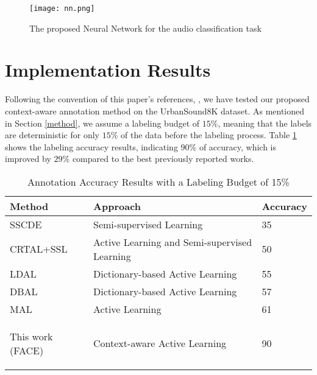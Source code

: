 \documentclass{article}
\begin{document}
\begin{figure}
	\centering	
	\texttt{[image: nn.png]}  		
	\caption{The proposed Neural Network for the audio classification task}
	\label{fig: nn}
\end{figure}

\section{Implementation Results}
\label{results}
Following the convention of this paper's references, \citep{Shuyang, Takagi, Dilek, Malte, Qin, Ji}, we have tested our proposed context-aware annotation method on the UrbanSound8K dataset. As mentioned in Section \ref{method}, we assume a labeling budget of $15\%$, meaning that the labels are deterministic for only $15\%$ of the data before the labeling process. Table \ref{tab: label} shows the labeling accuracy results, indicating $90\%$ of accuracy, which is improved by $29\%$ compared to the best previously reported works. 

\begin{table}
	\caption{Annotation Accuracy Results with a Labeling Budget of 15\%}
	\centering
	\begin{tabular}{lll}
		\toprule
		Method     & Approach     & Accuracy	\\
		\midrule
		SSCDE\citep{Takagi}	& Semi-supervised Learning	& 35	\\
		CRTAL+SSL\citep{Dilek, Malte}	& Active Learning and Semi-supervised Learning	& 50	\\	
		LDAL\citep{Qin}	& Dictionary-based Active Learning	& 55	\\
		DBAL\citep{Ji}	& Dictionary-based Active Learning	& 57	\\
		MAL\citep{Shuyang}	& Active Learning	& 61	\\
		\begin{bfseries}This work (FACE) \end{bfseries}	& \begin{bfseries}Context-aware Active Learning\end{bfseries}	& \begin{bfseries}90\end{bfseries}	\\
		\bottomrule
	\end{tabular}
	\label{tab: label}
\end{table}
\end{document}
